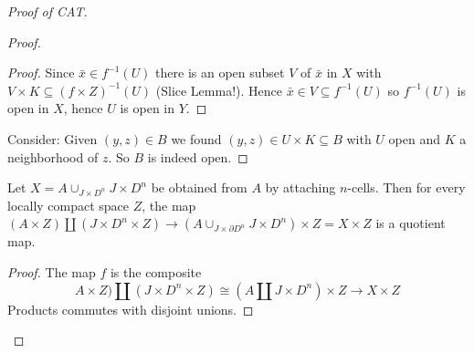 \documentclass{TemplateLecture}
\begin{document}
\begin{proof}[Proof of CAT]
\begin{proof}
\begin{proof}
            Since \(\bar x \in f^{-1}(U)\) there is an open subset \(V\) of \(\bar x\) in \(X\) with \(V\times K \subseteq (f\times Z)^{-1}(U)\) (Slice Lemma!). Hence \(\bar x \in V \subseteq f^{-1}(U)\) so \(f^{-1}(U)\) is open in \(X\), hence \(U\) is open in \(Y\).
        \end{proof}

        Consider: Given \((y,z) \in B\) we found
        \((y,z) \in U\times K \subseteq B\) with \(U\) open and \(K\) a neighborhood of \(z\).
        So \(B\) is indeed open.
    \end{proof}

    \begin{corollary}
        Let \(X = A \cup_{J\times D^n} J\times D^n\) be obtained from \(A\) by attaching \(n\)-cells. Then for every locally compact space \(Z\), the map \((A\times Z) \amalg (J\times D^n \times Z) \to (A \cup_{J\times \partial D^n} J\times D^n) \times Z = X \times Z\) is a quotient map.
    \end{corollary}
    \begin{proof}
        The map \(f\) is the composite
        \[A\times Z) \amalg (J\times D^n \times Z) \cong (A \amalg J\times D^n) \times Z \to X\times Z\]
        Products commutes with disjoint unions.
    \end{proof}


\end{proof}
\end{document}

